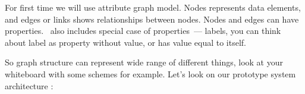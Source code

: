\secdown

For first time we will use attribute graph model. Nodes represents data
elements, and edges or links shows relationships between nodes. Nodes and edges
can have properties. \neo\ also includes special case of properties\ --- labels,
you can think about label as property without value, or has value equal to
itself.

So graph structure can represent wide range of different things, look at your
whiteboard with some schemes for example. Let’s look on our prototype system
architecture :



\secup
